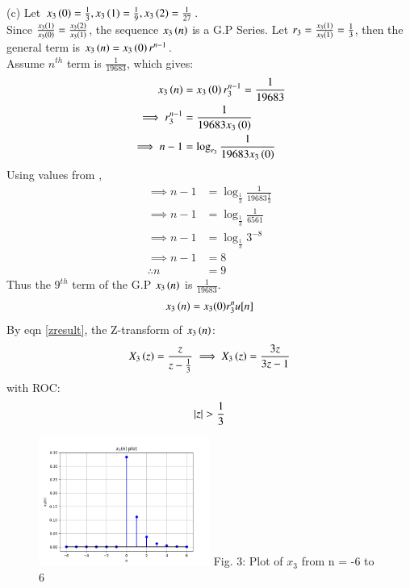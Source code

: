 \documentclass[journal,12pt,twocolumn]{IEEEtran}
\theoremstyle{remark}
\begin{document}
(c) Let $x_3\left(0\right) = \frac{1}{3}, x_3\left(1\right) = \frac{1}{9}, x_3\left(2\right) = \frac{1}{27}$.\\
Since $\frac{x_3\left(1\right)}{x_3\left(0\right)} = \frac{x_3\left(2\right)}{x_3\left(1\right)}$, the sequence $x_3\left(n\right)$ is a G.P Series.
Let $r_3 = \frac{x_3\left(1\right)}{x_3\left(1\right)} = \frac{1}{3}$, then the general term is $x_3\left(n\right) = x_3\left(0\right) r^{n-1}$.\\
Assume $n^{th}$ term is $\frac{1}{19683}$, which gives: 
\begin{align}
    x_3\left(n\right) &= x_3\left(0\right) r_3^{n-1} = \frac{1}{19683}\\
    \implies r_3^{n-1} &= \frac{1}{19683 x_3\left(0\right)}\\
    \implies n - 1 &= \log_{r_3}{\frac{1}{19683 x_3\left(0\right)}}
\end{align}
Using values from ,
\begin{align}
    \implies n - 1 &= \log_{\frac{1}{3}}{\frac{1}{19683 \frac{1}{3}}}\\
    \implies n - 1 &= \log_{\frac{1}{3}}{\frac{1}{6561}}\\
    \implies n - 1 &= \log_{\frac{1}{3}}{3^{-8}}\\
    \implies n - 1 &= 8\\
    \therefore n &= 9
\end{align}
Thus the $9^{th}$ term of the G.P $x_3\left(n\right)$ is $\frac{1}{19683}$.
\begin{align}  x_3\left(n\right) = x_3(0)r_3^{n}u[n]  \end{align}
By eqn \ref{zresult}, the Z-transform of $x_3\left(n\right)$:
\begin{align}
    X_3\left(z\right) = \frac{z}{z - \frac{1}{3}}
    \implies X_3\left(z\right) = \frac{3z}{3z - 1}
\end{align} with ROC: \[ \left\vert z\right\vert > \frac{1}{3} \]

\begin{figure}[h!]
    \centering
    \includegraphics[width=0.5\textwidth]{figs/c.png}
    Fig. 3: Plot of $x_3$ from n = -6 to 6
    \label{fig:img3}
\end{figure}


\end{document}
